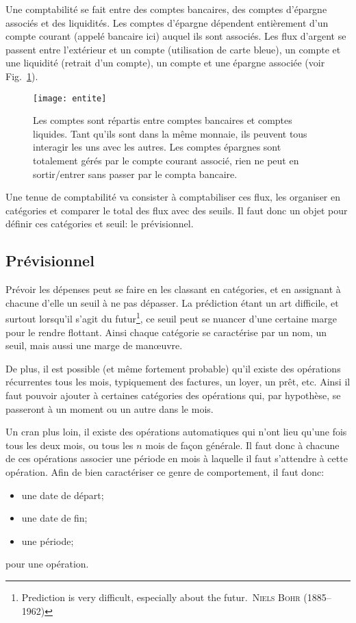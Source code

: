 Une comptabilité se fait entre des comptes bancaires, des comptes d'épargne
associés et des liquidités. Les comptes d'épargne dépendent entièrement d'un
compte courant (appelé bancaire ici) auquel ils sont associés. Les flux d'argent
se passent entre l'extérieur et un compte (utilisation de carte bleue), un compte
et une liquidité (retrait d'un compte), un compte et une épargne associée
(voir Fig.~\ref{compta:comptes}).
\begin{figure}
\centering
\texttt{[image: entite]}
\caption{\label{compta:comptes}Les comptes sont répartis entre comptes bancaires et
        comptes liquides. Tant qu'ils sont dans la même monnaie, ils peuvent tous
        interagir les uns avec les autres. Les comptes épargnes sont totalement gérés
        par le compte courant associé, rien ne peut en sortir/entrer sans passer
        par le compta bancaire.}
\end{figure}

Une tenue de comptabilité va consister à comptabiliser ces flux, les organiser
en catégories et comparer le total des flux avec des seuils. Il faut donc
un objet pour définir ces catégories et seuil: le prévisionnel.

\subsection{Prévisionnel}

Prévoir les dépenses peut se faire en les classant en catégories,
et en assignant à chacune d'elle un seuil à ne pas dépasser. 
La prédiction étant un art difficile,
et surtout lorsqu'il s'agit du futur\footnote{\og Prediction is very
difficult, especially about the futur.\fg\ \textsc{Niels Bohr}
(1885--1962)}, ce seuil peut se nuancer d'une certaine marge
pour le rendre flottant.
Ainsi chaque catégorie se caractérise par un nom, un seuil, mais
aussi une marge de man\oe uvre.

De plus, il est possible (et même fortement probable) qu'il existe des
opérations récurrentes tous les mois, typiquement des factures, 
un loyer, un prêt, etc. Ainsi il faut pouvoir ajouter
à certaines catégories des opérations qui, par hypothèse,
se passeront à un moment ou un autre dans le mois.

Un cran plus loin, il existe des opérations automatiques qui n'ont lieu qu'une
fois tous les deux mois, ou tous les $n$ mois de façon générale.
Il faut donc à chacune de ces opérations associer une période en
mois à laquelle il faut s'attendre à cette opération. Afin de bien
caractériser ce genre de comportement, il faut donc:
\begin{itemize}
\item une date de départ;
\item une date de fin;
\item une période;
\end{itemize}
pour une opération.

